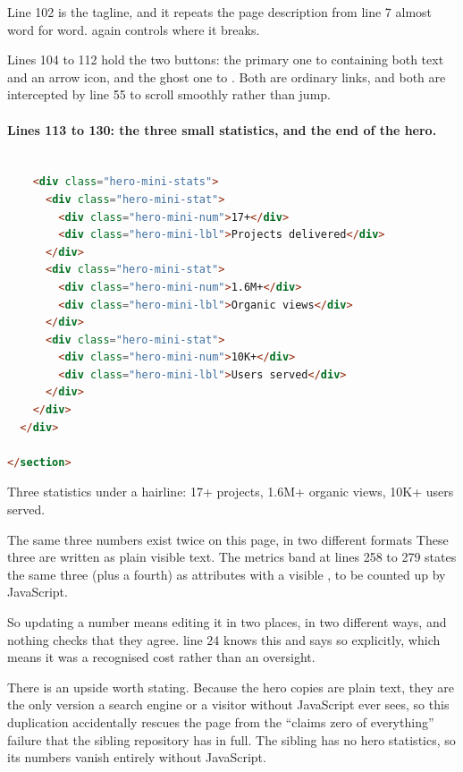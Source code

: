 Line 102 is the tagline, and it repeats the page description from line 7 almost
word for word.  again controls where it breaks.

Lines 104 to 112 hold the two buttons: the primary one to  containing
both text and an arrow icon, and the ghost one to . Both are ordinary
links, and both are intercepted by  line 55 to scroll smoothly rather
than jump.

\paragraph{Lines 113 to 130: the three small statistics, and the end of the hero.}

\begin{lstlisting}[language=HTML,firstnumber=113,caption={\file{index.html}, lines 113--130}]

    <div class="hero-mini-stats">
      <div class="hero-mini-stat">
        <div class="hero-mini-num">17+</div>
        <div class="hero-mini-lbl">Projects delivered</div>
      </div>
      <div class="hero-mini-stat">
        <div class="hero-mini-num">1.6M+</div>
        <div class="hero-mini-lbl">Organic views</div>
      </div>
      <div class="hero-mini-stat">
        <div class="hero-mini-num">10K+</div>
        <div class="hero-mini-lbl">Users served</div>
      </div>
    </div>
  </div>

</section>
\end{lstlisting}

Three statistics under a hairline: 17+ projects, 1.6M+ organic views, 10K+ users
served.

\begin{honest}{The same three numbers exist twice on this page, in two different
formats}
These three are written as plain visible text. The metrics band at lines 258 to 279
states the same three (plus a fourth) as  attributes with a
visible , to be counted up by JavaScript.

So updating a number means editing it in two places, in two different ways, and
nothing checks that they agree.  line 24 knows this and says so
explicitly, which means it was a recognised cost rather than an oversight.

There is an upside worth stating. Because the hero copies are plain text, they are
the only version a search engine or a visitor without JavaScript ever sees, so this
duplication accidentally rescues the page from the ``claims zero of everything''
failure that the sibling repository has in full. The sibling has no hero
statistics, so its numbers vanish entirely without JavaScript.
\end{honest}

